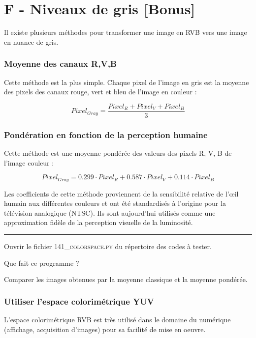 \documentclass[a4paper,12pt,titlepage]{article} %
\begin{document}
\newpage
\section{F - Niveaux de gris {[Bonus]}}

Il existe plusieurs méthodes pour transformer une image en RVB vers une image en nuance de gris.

\subsubsection{Moyenne des canaux R,V,B}

Cette méthode est la plus simple. Chaque pixel de l'image en gris est la moyenne des pixels des canaux rouge, vert et bleu de l'image en couleur :

$$Pixel_{Gray} = \frac{Pixel_{R} + Pixel_{V} + Pixel_{B}}{3}$$ 


\subsubsection{Pondération en fonction de la perception humaine}

Cette méthode est une moyenne pondérée des valeurs des pixels R, V, B de l'image couleur : 

$$Pixel_{Gray} = 0.299 \cdot Pixel_{R} + 0.587 \cdot Pixel_{V} + 0.114 \cdot Pixel_{B}$$ 


Les coefficients de cette méthode proviennent de la sensibilité relative de l'œil humain aux différentes couleurs et ont été standardisés à l'origine pour la télévision analogique (NTSC). Ils sont aujourd'hui utilisés comme une approximation fidèle de la perception visuelle de la luminosité.


\noindent \rule{\linewidth}{1pt}

\Manip Ouvrir le fichier \textsc{141\_colorspace.py} du répertoire des codes à tester.

\Quest Que fait ce programme ? 

\Manip Comparer les images obtenues par la moyenne classique et la moyenne pondérée.

\subsubsection{Utiliser l'espace colorimétrique YUV}

L'espace colorimétrique RVB est très utilisé dans le domaine du numérique (affichage, acquisition d'images) pour sa facilité de mise en oeuvre.
\end{document}

